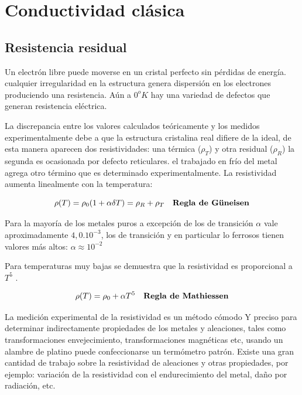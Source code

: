\section{Conductividad clásica}
\label{sec:pruebasHW}

\subsection{Resistencia residual} 

Un electrón libre puede moverse en un cristal perfecto sin pérdidas de energía. cualquier irregularidad en la estructura genera dispersión en los electrones produciendo una resistencia. Aún a $0^{o}K$ hay una variedad de defectos que generan resistencia eléctrica.

La discrepancia entre los valores calculados teóricamente y los medidos experimentalmente debe a que la estructura cristalina real difiere de la ideal, de esta manera aparecen dos resistividades: una térmica ($\rho_{T}$) y otra residual ($\rho_{R}$) la segunda es ocasionada por defecto reticulares. el trabajado en frío del metal agrega otro término que es determinado experimentalmente. La resistividad aumenta linealmente con la temperatura:


\begin{equation}
\rho(T)= \rho_{0}(1+\alpha \delta T) = \rho_{R} + \rho_{T} \quad \text{\textbf{Regla de G\"uneisen}}  
\end{equation}

Para la mayoría de los metales puros a excepción de los de transición $\alpha$ vale aproximadamente $4,0.10^{-3}$, los de transición y en particular lo ferrosos tienen valores más altos: $\alpha \approx 10^{-2}$

Para temperaturas muy bajas se demuestra que la resistividad es proporcional a $T^{5}$ .

\begin{equation}
	\rho(T)= \rho_{0}+\alpha T^{5} \quad \text{\textbf{Regla de Mathiessen}}  
\end{equation}

La medición experimental de la resistividad es un método cómodo Y preciso para determinar indirectamente propiedades de los metales y aleaciones, tales como transformaciones envejecimiento, transformaciones magnéticas etc, usando un alambre de platino puede confeccionarse un termómetro patrón. Existe una gran cantidad de trabajo sobre la resistividad de aleaciones y otras propiedades, por ejemplo: variación de la resistividad con el endurecimiento del metal, daño por radiación, etc.

